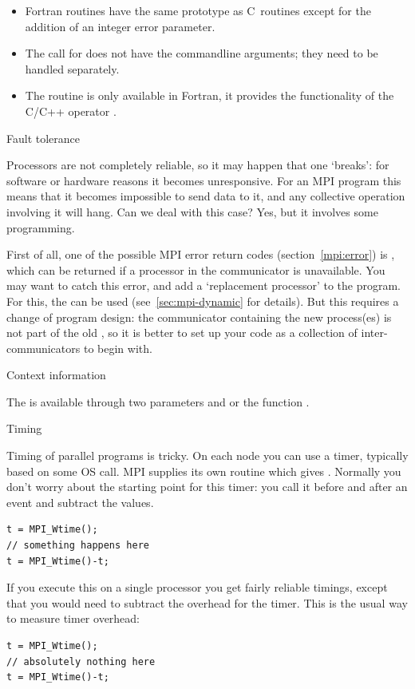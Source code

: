 \begin{itemize}
\item Fortran routines have the same prototype as C~routines except for the addition
  of an integer error parameter.
\item The call for  does not have the commandline arguments;
  they need to be handled separately.
\item The routine  is only available in Fortran, it provides the 
  functionality of the C/C++ operator .
\end{itemize}


 {Fault tolerance}
\label{mpi:tolerant}

Processors are not completely reliable, so it may happen that one
`breaks': for software or hardware reasons it becomes
unresponsive. For an MPI program this means that it becomes impossible
to send data to it, and any collective operation involving it will
hang. Can we deal with this case? Yes, but it involves some
programming.

First of all, one of the possible MPI error return codes
(section~\ref{mpi:error}) is , which can be returned
if a processor in the communicator is unavailable. You may want to
catch this error, and add a `replacement processor' to the
program. For this, the  can be used
(see~\ref{sec:mpi-dynamic} for details).
%
But this requires a change of program design: the communicator
containing the new process(es) is not part of the
old , so it is better to set up your code as a
collection of inter-communicators to begin with.

 {Context information}
\label{sec:context}

The  is available through two parameters
 and 
or the function .

 {Timing}
\label{sec:mpi-timing}

Timing of parallel programs is tricky. On each node you can use a timer,
typically based on some \ac{OS} call. MPI supplies its own routine
 which gives .
Normally you don't worry about the starting point for this timer: 
you call it before and after an event and subtract the values.
\begin{lstlisting}
t = MPI_Wtime();
// something happens here
t = MPI_Wtime()-t;
\end{lstlisting}
If you execute this on a single processor you get fairly reliable
timings, except that you would need to subtract the overhead for the
timer. This is the usual way to measure timer overhead:
\begin{lstlisting}
t = MPI_Wtime();
// absolutely nothing here
t = MPI_Wtime()-t;
\end{lstlisting}

